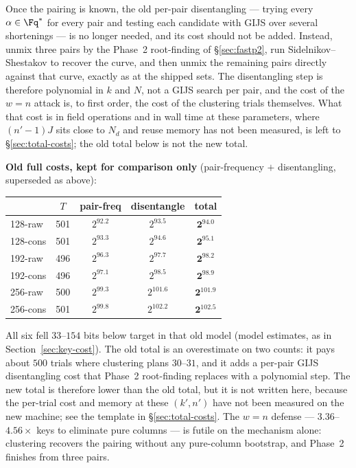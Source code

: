 Once the pairing is known, the old per-pair disentangling ---
trying every $\alpha \in \Fq^*$ for every pair and testing each
candidate with GIJS over several shortenings --- is no longer
needed, and its cost should not be added. Instead, unmix three
pairs by the Phase~2 root-finding of \S\ref{sec:fastp2}, run
Sidelnikov--Shestakov to recover the curve, and then unmix the
remaining pairs directly against that curve, exactly as at the
shipped sets. The disentangling step is therefore polynomial
in $k$ and $N$, not a GIJS search per pair, and the cost of
the $w=n$ attack is, to first order, the cost of the clustering
trials themselves. What that cost is in field operations and
in wall time at these parameters, where $(n'-1)J$ sits close
to $N_d$ and reuse memory has not been measured, is left to
\S\ref{sec:total-costs}; the old total below is not the new
total.

\textbf{Old full costs, kept for comparison only}
(pair-frequency $+$ disentangling, superseded as above):
\begin{center}
    \begin{tabular}{lcccc}
        \toprule
                 & $T$ & pair-freq   & disentangle & total                \\
        \midrule
        128-raw  & 501 & $2^{92.2}$  & $2^{93.5}$  & $\mathbf{2^{94.0}}$  \\
        128-cons & 501 & $2^{93.3}$  & $2^{94.6}$  & $\mathbf{2^{95.1}}$  \\
        192-raw  & 496 & $2^{96.3}$  & $2^{97.7}$  & $\mathbf{2^{98.2}}$  \\
        192-cons & 496 & $2^{97.1}$  & $2^{98.5}$  & $\mathbf{2^{98.9}}$  \\
        256-raw  & 500 & $2^{99.3}$  & $2^{101.6}$ & $\mathbf{2^{101.9}}$ \\
        256-cons & 501 & $2^{99.8}$  & $2^{102.2}$ & $\mathbf{2^{102.5}}$ \\
        \bottomrule
    \end{tabular}
\end{center}
All six fell $33$--$154$ bits below target in that old model
(model estimates, as in Section~\ref{sec:key-cost}). The old
total is an overestimate on two counts: it pays about $500$
trials where clustering plans $30$--$31$, and it adds a
per-pair GIJS disentangling cost that Phase~2 root-finding
replaces with a polynomial step. The new total is therefore
lower than the old total, but it is not written here, because
the per-trial cost and memory at these $(k', n')$ have not
been measured on the new machine; see the template in
\S\ref{sec:total-costs}. The $w=n$ defense ---
$3.36$--$4.56\times$
keys to eliminate pure columns --- is futile on the mechanism
alone: clustering recovers the pairing without any
pure-column bootstrap, and Phase~2 finishes from three pairs.